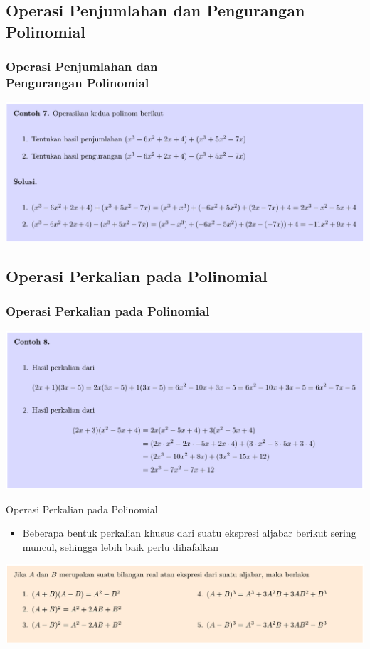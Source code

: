 \documentclass[pdflatex,compress,mathserif]{beamer}
\begin{document}
\subsection{Operasi Penjumlahan dan Pengurangan Polinomial}

\begin{frame}
	\frametitle{Operasi Penjumlahan dan\\Pengurangan Polinomial}
	\begin{center}
		\includegraphics[width=\linewidth]{img/img21}
	\end{center}
\end{frame}

\subsection{Operasi Perkalian pada Polinomial}

\begin{frame}
	\frametitle{Operasi Perkalian pada Polinomial}
	\begin{center}
		\includegraphics[width=\linewidth]{img/img22}
	\end{center}
\end{frame}

\begin{frame}{Operasi Perkalian pada Polinomial}
	\begin{itemize}
		\item Beberapa bentuk perkalian khusus dari suatu ekspresi aljabar berikut sering muncul, sehingga lebih baik perlu dihafalkan
	\end{itemize}
	\begin{center}
		\includegraphics[width=\linewidth]{img/img23}
	\end{center}
\end{frame}
\end{document}
